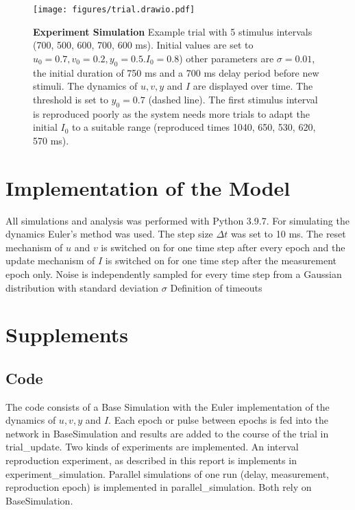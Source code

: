 \documentclass[9pt]{article}
\begin{document}
\begin{figure}[h]
	\centering
	\texttt{[image: figures/trial.drawio.pdf]}
	\caption{\textbf{Experiment Simulation} Example trial with 5 stimulus intervals (700, 500, 600, 700, 600 ms). Initial values are set to $u_0=0.7 , v_0=0.2 , y_0=0.5. I_0=0.8$) other parameters are $\sigma=0.01$, the initial duration of 750 ms and a 700 ms delay period before new stimuli. The dynamics of $u, v, y $ and $I$ are displayed over time. The threshold is set to $y_0=0.7$ (dashed line). The first stimulus interval is reproduced poorly as the system needs more trials to adapt the initial $I_0$ to a suitable range (reproduced times 1040, 650, 530, 620, 570 ms).}
\label{fig:trial}
\end{figure}


\section{Implementation of the Model}
All simulations and analysis was performed with Python 3.9.7. 
For simulating the dynamics Euler's method was used. The step size $\Delta t$ was set to 10 ms.
The reset mechanism of $u$ and $v$ is switched on for one time step after every epoch and the update mechanism of $I$ is switched on for one time step after the measurement epoch only. 
Noise is independently sampled for every time step from a Gaussian distribution with standard deviation $\sigma$
Definition of timeouts


\section{Supplements}

\subsection{Code}
The code consists of a Base Simulation with the Euler implementation of the dynamics of $u, v, y$ and $I$. Each epoch or pulse between epochs is fed into the network in BaseSimulation and results are added to the course of the trial in trial_update. 
Two kinds of experiments are implemented. An interval reproduction experiment, as described in this report is implements in experiment_simulation. Parallel simulations of one run (delay, measurement, reproduction epoch) is implemented in parallel_simulation. Both rely on BaseSimulation.  
\begin{figure}[h]
\label{fig:code}
\end{figure}

\printbibliography
\end{document}
